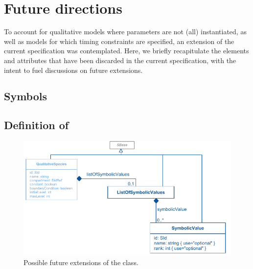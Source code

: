 
\section{Future directions}
\label{apdx-future}

To account for qualitative models where parameters are not (all) instantiated, as well as models for which timing constraints are specified, an extension of the current specification was contemplated. Here, we briefly recapitulate the elements and attributes that have been discarded in the current specification, with the intent to fuel discussions on future extensions.




\subsection{Symbols}

\subsection*{Definition of } %

\begin{figure}[hb]
  \includegraphics{figs/qual-qualitative-species-future-uml.pdf}
  \caption{Possible future extensions of the \QualitativeSpecies class.}
  \label{qual_future_directions}
\end{figure}


